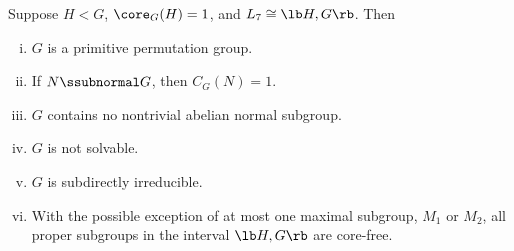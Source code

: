 \begin{frame}[fragile,label=L7second,shrink=5]{}
  \begin{center}
    {
      \begin{tikzpicture}[scale=.7]
        
      \end{tikzpicture}
    }
  \end{center}

\begin{prop}
\label{thm:except-seven-elem}
Suppose $H<G$, $\core_G(H) = 1$, and 
$L_7 \cong \lb H,G \rb$.  Then
\begin{enumerate}[(i)]
\item<1-> $G$ is a primitive permutation group.
\item<1-> If $N\ssubnormal G$, then $C_G(N) = 1$.
\item<1-> $G$ contains no nontrivial abelian normal subgroup.
\item<1-> $G$ is not solvable.
\item<1-> $G$ is subdirectly irreducible.
\item<1-> With the possible exception of at most one maximal subgroup, $M_1$ or $M_2$,
  all proper subgroups in the interval $\lb H,G \rb$ are core-free. 

\end{enumerate}
\end{prop}
\end{frame}

